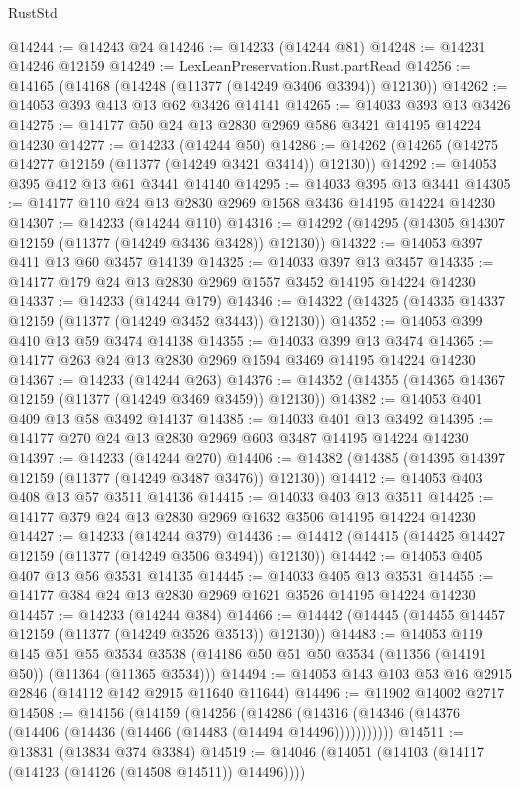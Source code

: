\begin{lexlean}{RustStd}
\begin{coremodule}
{\begin{coremodule}
{{{{{{{{{{{{{{{{{{{{{{{{{{{{{{{{{@14244 := @14243 @24
@14246 := @14233 (@14244 @81)
@14248 := @14231 @14246 @12159
@14249 := LexLeanPreservation.Rust.partRead
@14256 := @14165 (@14168 (@14248 (@11377 (@14249 @3406 @3394)) @12130))
@14262 := @14053 @393 @413 @13 @62 @3426 @14141
@14265 := @14033 @393 @13 @3426
@14275 := @14177 @50 @24 @13 @2830 @2969 @586 @3421 @14195 @14224 @14230
@14277 := @14233 (@14244 @50)
@14286 := @14262 (@14265 (@14275 @14277 @12159 (@11377 (@14249 @3421 @3414)) @12130))
@14292 := @14053 @395 @412 @13 @61 @3441 @14140
@14295 := @14033 @395 @13 @3441
@14305 := @14177 @110 @24 @13 @2830 @2969 @1568 @3436 @14195 @14224 @14230
@14307 := @14233 (@14244 @110)
@14316 := @14292 (@14295 (@14305 @14307 @12159 (@11377 (@14249 @3436 @3428)) @12130))
@14322 := @14053 @397 @411 @13 @60 @3457 @14139
@14325 := @14033 @397 @13 @3457
@14335 := @14177 @179 @24 @13 @2830 @2969 @1557 @3452 @14195 @14224 @14230
@14337 := @14233 (@14244 @179)
@14346 := @14322 (@14325 (@14335 @14337 @12159 (@11377 (@14249 @3452 @3443)) @12130))
@14352 := @14053 @399 @410 @13 @59 @3474 @14138
@14355 := @14033 @399 @13 @3474
@14365 := @14177 @263 @24 @13 @2830 @2969 @1594 @3469 @14195 @14224 @14230
@14367 := @14233 (@14244 @263)
@14376 := @14352 (@14355 (@14365 @14367 @12159 (@11377 (@14249 @3469 @3459)) @12130))
@14382 := @14053 @401 @409 @13 @58 @3492 @14137
@14385 := @14033 @401 @13 @3492
@14395 := @14177 @270 @24 @13 @2830 @2969 @603 @3487 @14195 @14224 @14230
@14397 := @14233 (@14244 @270)
@14406 := @14382 (@14385 (@14395 @14397 @12159 (@11377 (@14249 @3487 @3476)) @12130))
@14412 := @14053 @403 @408 @13 @57 @3511 @14136
@14415 := @14033 @403 @13 @3511
@14425 := @14177 @379 @24 @13 @2830 @2969 @1632 @3506 @14195 @14224 @14230
@14427 := @14233 (@14244 @379)
@14436 := @14412 (@14415 (@14425 @14427 @12159 (@11377 (@14249 @3506 @3494)) @12130))
@14442 := @14053 @405 @407 @13 @56 @3531 @14135
@14445 := @14033 @405 @13 @3531
@14455 := @14177 @384 @24 @13 @2830 @2969 @1621 @3526 @14195 @14224 @14230
@14457 := @14233 (@14244 @384)
@14466 := @14442 (@14445 (@14455 @14457 @12159 (@11377 (@14249 @3526 @3513)) @12130))
@14483 := @14053
    @119
    @145
    @51
    @55
    @3534
    @3538
    (@14186 @50 @51 @50 @3534 (@11356 (@14191 @50)) (@11364 (@11365 @3534)))
@14494 := @14053 @143 @103 @53 @16 @2915 @2846 (@14112 @142 @2915 @11640 @11644)
@14496 := @11902 @14002 @2717
@14508 := @14156
    (@14159
      (@14256
        (@14286 (@14316 (@14346 (@14376 (@14406 (@14436 (@14466 (@14483 (@14494 @14496)))))))))))
@14511 := @13831 (@13834 @374 @3384)
@14519 := @14046 (@14051 (@14103 (@14117 (@14123 (@14126 (@14508 @14511)) @14496))))
}}}}}}}}}}}}}}}}}}}}}}}}}}}}}}}}}
\end{coremodule}}
\end{coremodule}
\end{lexlean}
